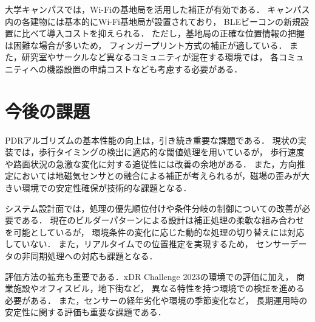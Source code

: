 \documentclass[a4paper, 10pt, twocolumn]{jarticle}
\begin{document}
大学キャンパスでは，Wi-Fiの基地局を活用した補正が有効である．
キャンパス内の各建物には基本的にWi-Fi基地局が設置されており，
BLEビーコンの新規設置に比べて導入コストを抑えられる．
ただし，基地局の正確な位置情報の把握は困難な場合が多いため，
フィンガープリント方式の補正が適している．
また，研究室やサークルなど異なるコミュニティが混在する環境では，
各コミュニティへの機器設置の申請コストなども考慮する必要がある．

\section{今後の課題}

PDRアルゴリズムの基本性能の向上は，引き続き重要な課題である．
現状の実装では，歩行タイミングの検出に適応的な閾値処理を用いているが，
歩行速度や路面状況の急激な変化に対する追従性には改善の余地がある．
また，方向推定においては地磁気センサとの融合による補正が考えられるが，磁場の歪みが大きい環境での安定性確保が技術的な課題となる．

システム設計面では，処理の優先順位付けや条件分岐の制御についての改善が必要である．
現在のビルダーパターンによる設計は補正処理の柔軟な組み合わせを可能としているが，
環境条件の変化に応じた動的な処理の切り替えには対応していない．
また，リアルタイムでの位置推定を実現するため，
センサーデータの非同期処理への対応も課題となる．

評価方法の拡充も重要である．xDR Challenge 2023の環境での評価に加え，
商業施設やオフィスビル，地下街など，
異なる特性を持つ環境での検証を進める必要がある．
また，センサーの経年劣化や環境の季節変化など，
長期運用時の安定性に関する評価も重要な課題である．





\end{document}
